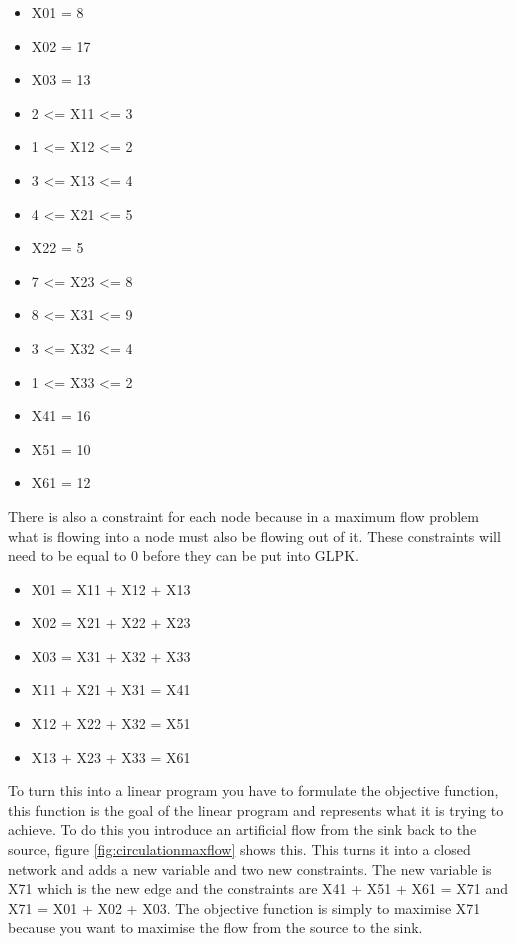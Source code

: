 \documentclass[10pt]{article}
\begin{document}
\begin{itemize}
    
    \item X01 = 8
    \item X02 = 17
    \item X03  = 13
    
    \item 2 <= X11 <= 3
    \item 1 <= X12 <= 2
    \item 3 <= X13 <= 4
    
    \item 4 <= X21 <= 5
    \item  X22 = 5
    \item 7 <= X23 <= 8
    
    \item 8 <= X31 <= 9
    \item 3 <= X32 <= 4
    \item 1 <= X33 <= 2
    
    \item X41 = 16
    \item X51 = 10
    \item X61 = 12

\end{itemize}

There is also a constraint for each node because in a maximum flow problem what is flowing into a node must also be flowing out of it. These constraints will need to be equal to 0 before they can be put into GLPK.
\begin{itemize}
    \item X01 = X11 + X12 + X13
    \item X02 = X21 + X22 + X23
    \item X03 = X31 + X32 + X33
    \item X11 + X21 + X31 = X41
    \item X12 + X22 + X32 = X51
    \item X13 + X23 + X33 = X61
\end{itemize}

To turn this into a linear program you have to formulate the objective function, this function is the goal of the linear program and represents what it is trying to achieve. To do this you introduce an artificial flow from the sink back to the source, figure \ref{fig:circulationmaxflow} shows this. This turns it into a closed network and adds a new variable and two new constraints. The new variable is X71 which is the new edge and the constraints are X41 + X51 + X61 = X71 and X71 = X01 + X02 + X03. The objective function is simply to maximise X71 because you want to maximise the flow from the source to the sink.
\end{document}
